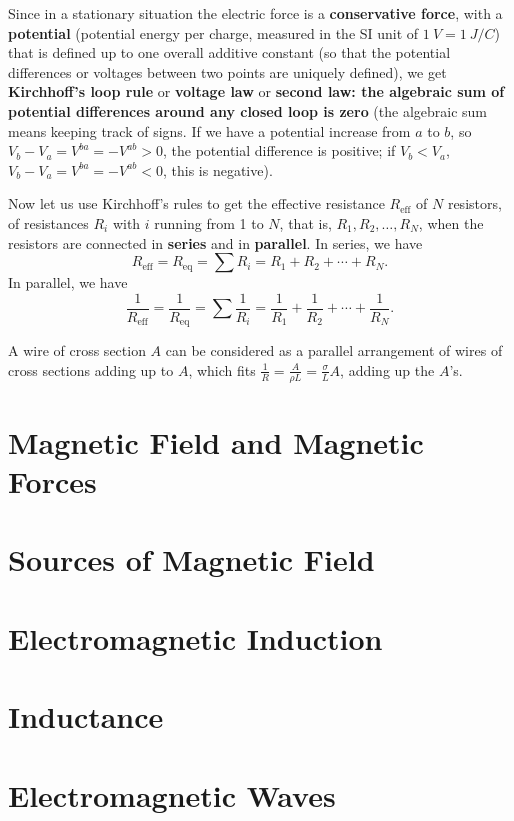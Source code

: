 \documentclass[11pt, letterpaper, titlepage]{report}
\begin{document}
Since in a stationary situation the electric force is a \textbf{conservative force}, with a \textbf{potential} (potential energy per charge, measured in the SI unit of $\SI{1}{V} = \SI{1}{J/C}$) that is defined up to one overall additive constant (so that the potential differences or voltages between two points are uniquely defined), we get \textbf{Kirchhoff's loop rule} or \textbf{voltage law} or \textbf{second law: the algebraic sum of potential differences around any closed loop is zero} (the algebraic sum means keeping track of signs. If we have a potential increase from $a$ to $b$, so $V_b - V_a = V^{ba} = -V^{ab} > 0$, the potential difference is positive; if $V_b < V_a$, $V_b - V_a = V^{ba} = -V^{ab} < 0$, this is negative).

Now let us use Kirchhoff's rules to get the effective resistance $R_\text{eff}$ of $N$ resistors, of resistances $R_i$ with $i$ running from 1 to $N$, that is, $R_1, R_2, \ldots, R_N$, when the resistors are connected in \textbf{series} and in \textbf{parallel}. In series, we have 
\begin{equation}
R_\text{eff} = R_\text{eq} = \sum R_i = R_1 + R_2 + \cdots + R_N.
\end{equation}
In parallel, we have
\begin{equation}
\dfrac{1}{R_\text{eff}} = \dfrac{1}{R_\text{eq}} = \sum \dfrac{1}{R_i} = \dfrac{1}{R_1} + \dfrac{1}{R_2} + \cdots + \dfrac{1}{R_N}.
\end{equation}

A wire of cross section $A$ can be considered as a parallel arrangement of wires of cross sections adding up to $A$, which fits $\frac{1}{R} = \frac{A}{\rho L} = \frac{\sigma}{L}A$, adding up the $A$'s.

\chapter{Magnetic Field and Magnetic Forces}
\chapter{Sources of Magnetic Field}
\chapter{Electromagnetic Induction}
\chapter{Inductance}
\chapter{Electromagnetic Waves}
\end{document}
